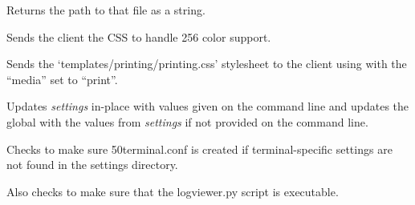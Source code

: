 \documentclass[letterpaper,10pt,openany]{sphinxmanual}
\begin{document}
\begin{fulllineitems}
\begin{fulllineitems}
Returns the path to that file as a string.

\end{fulllineitems}


\begin{fulllineitems}
\label{Applications/terminal/app_terminal:app_terminal.TerminalApplication.send_256_colors}
Sends the client the CSS to handle 256 color support.

\end{fulllineitems}


\begin{fulllineitems}
\label{Applications/terminal/app_terminal:app_terminal.TerminalApplication.send_print_stylesheet}
Sends the `templates/printing/printing.css' stylesheet to the client
using  with the ``media'' set to
``print''.

\end{fulllineitems}


\end{fulllineitems}


\begin{fulllineitems}
\label{Applications/terminal/app_terminal:app_terminal.apply_cli_overrides}
Updates \emph{settings} in-place with values given on the command line and
updates the  global with the values from \emph{settings} if not provided
on the command line.

\end{fulllineitems}


\begin{fulllineitems}
\label{Applications/terminal/app_terminal:app_terminal.init}
Checks to make sure 50terminal.conf is created if terminal-specific settings
are not found in the settings directory.

Also checks to make sure that the logviewer.py script is executable.

\end{fulllineitems}
\end{document}
